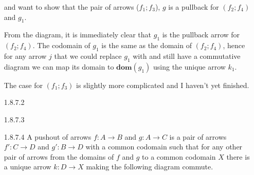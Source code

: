 \documentclass{article}
\begin{document}
\begin{enumerate}
  and want to show that the pair of arrows ($f_1; f_3$), $g$ is a pullback for $(f_2; f_4)$ and $g_1$.

  \begin{center}
  \end{center}

  From the diagram, it is immediately clear that $g_1$ is the pullback arrow for $(f_2; f_4)$.
  The codomain of $g_1$ is the same as the domain of $(f_2; f_4)$, hence for any arrow $j$ that we could replace $g_1$ with and still have a commutative diagram we can map its domain to $\textbf{dom}(g_1)$ using the unique arrow $k_1$.

  The case for $(f_1; f_3)$ is slightly more complicated and I haven't yet finished.
  
\item []
\item [1.8.7.2]
\item []
\item [1.8.7.3]
\item []
\item [1.8.7.4]
  A pushout of arrows $f : A \rightarrow B$ and $g : A \rightarrow C$ is a pair of arrows $f' : C \rightarrow D$ and $g' : B \rightarrow D$ with a common codomain such that for any other pair of arrows from the domains of $f$ and $g$ to a common codomain $X$ there is a unique arrow $k : D \rightarrow X$ making the following diagram commute.
  \begin{center}
\end{center}
\end{enumerate}
\end{document}
